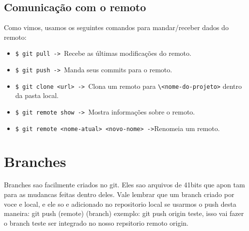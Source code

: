 \documentclass{article}
\begin{document}
\subsection{Comunicação com o remoto}
    Como vimos, usamos os seguintes comandos para mandar/receber dados do remoto:
    \begin{itemize}
        \item \verb#$ git pull -> #Recebe as últimas modificações do remoto.
        \item \verb#$ git push -> #Manda seus commits para o remoto.
        \item \verb#$ git clone <url> -> #Clona um remoto para \verb#\<nome-do-projeto># dentro da pasta local.
        \item \verb#$ git remote show -> #Mostra informações sobre o remoto.
        \item \verb#$ git remote <nome-atual> <novo-nome> ->#Renomeia um remoto.
    \end{itemize}

\section{Branches}
    Branches sao facilmente criados no git. Eles sao arquivos de 41bits que apon
tam para as mudancas feitas dentro deles. Vale lembrar que um branch criado por
voce e local, e ele so e adicionado no repositorio local se usarmos o push desta
maneira:
    git push (remote) (branch)
exemplo: git push origin teste, isso vai fazer o branch teste ser integrado
no nosso repsitorio remoto origin.
\end{document}

